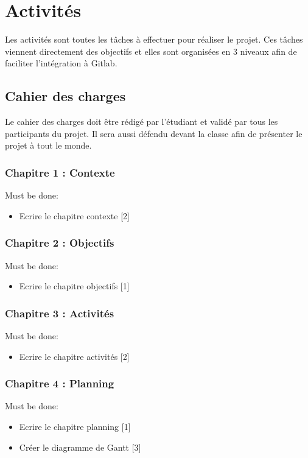 \chapter{Activités}
\label{chap:activités}

Les activités sont toutes les tâches à effectuer pour réaliser le projet. Ces tâches viennent directement des objectifs et elles sont organisées en 3 niveaux afin de faciliter l'intégration à Gitlab.

   \section{Cahier des charges}
   \label{sec:cdc}

      Le cahier des charges doit être rédigé par l'étudiant et validé par tous les participants du projet. Il sera aussi défendu devant la classe afin de présenter le projet à tout le monde.

      \subsection*{Chapitre 1 : Contexte}
         Must be done:
         \begin{itemize}
            \item Ecrire le chapitre contexte [2]
         \end{itemize}
      \subsection*{Chapitre 2 : Objectifs}
         Must be done:
         \begin{itemize}
            \item Ecrire le chapitre objectifs [1]
         \end{itemize}
      \subsection*{Chapitre 3 : Activités}
         Must be done:
         \begin{itemize}
            \item Ecrire le chapitre activités [2]
         \end{itemize}
      \subsection*{Chapitre 4 : Planning}
         Must be done:
         \begin{itemize}
            \item Ecrire le chapitre planning [1]
            \item Créer le diagramme de Gantt [3]
         \end{itemize}
